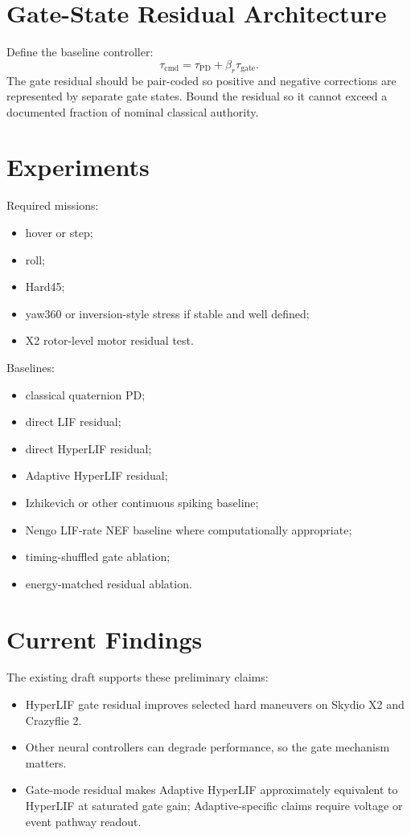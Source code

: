 \documentclass[journal]{IEEEtran}
\begin{document}
\section{Gate-State Residual Architecture}
Define the baseline controller:
\begin{equation}
\tau_{\mathrm{cmd}} = \tau_{\mathrm{PD}} + \beta_r \tau_{\mathrm{gate}}.
\end{equation}
The gate residual should be pair-coded so positive and negative corrections are represented by separate gate states. Bound the residual so it cannot exceed a documented fraction of nominal classical authority.

\section{Experiments}
Required missions:
\begin{itemize}
  \item hover or step;
  \item roll;
  \item Hard45;
  \item yaw360 or inversion-style stress if stable and well defined;
  \item X2 rotor-level motor residual test.
\end{itemize}

Baselines:
\begin{itemize}
  \item classical quaternion PD;
  \item direct LIF residual;
  \item direct HyperLIF residual;
  \item Adaptive HyperLIF residual;
  \item Izhikevich or other continuous spiking baseline;
  \item Nengo LIF-rate NEF baseline where computationally appropriate;
  \item timing-shuffled gate ablation;
  \item energy-matched residual ablation.
\end{itemize}

\section{Current Findings}
The existing draft supports these preliminary claims:
\begin{itemize}
  \item HyperLIF gate residual improves selected hard maneuvers on Skydio X2 and Crazyflie 2.
  \item Other neural controllers can degrade performance, so the gate mechanism matters.
  \item Gate-mode residual makes Adaptive HyperLIF approximately equivalent to HyperLIF at saturated gate gain; Adaptive-specific claims require voltage or event pathway readout.
\end{itemize}
\end{document}
